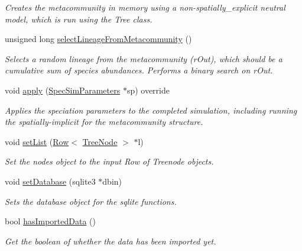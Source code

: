 \begin{DoxyCompactItemize}
\begin{DoxyCompactList}\small\item\em Creates the metacommunity in memory using a non-\/spatially\+\_\+explicit neutral model, which is run using the Tree class. \end{DoxyCompactList}\item 
unsigned long \hyperlink{group___community_objects_ac1884bfd79b272d8dcb470f34f579cf1}{select\+Lineage\+From\+Metacommunity} ()
\begin{DoxyCompactList}\small\item\em Selects a random lineage from the metacommunity (r\+Out), which should be a cumulative sum of species abundances. Performs a binary search on r\+Out. \end{DoxyCompactList}\item 
void \hyperlink{group___community_objects_adf30667aa617bc969706eab2facd5482}{apply} (\hyperlink{struct_spec_sim_parameters}{Spec\+Sim\+Parameters} $\ast$sp) override
\begin{DoxyCompactList}\small\item\em Applies the speciation parameters to the completed simulation, including running the spatially-\/implicit for the metacommunity structure. \end{DoxyCompactList}\item 
void \hyperlink{group___community_objects_a710a402dffa1b85183dd7f4a5a44f988}{set\+List} (\hyperlink{class_row}{Row}$<$ \hyperlink{class_tree_node}{Tree\+Node} $>$ $\ast$l)
\begin{DoxyCompactList}\small\item\em Set the nodes object to the input Row of Treenode objects. \end{DoxyCompactList}\item 
void \hyperlink{group___community_objects_a6fe2fdb93911f403dd879ca2847e4933}{set\+Database} (sqlite3 $\ast$dbin)
\begin{DoxyCompactList}\small\item\em Sets the database object for the sqlite functions. \end{DoxyCompactList}\item 
bool \hyperlink{group___community_objects_a045f762ca30c3a20e8ef5911a4982160}{has\+Imported\+Data} ()
\begin{DoxyCompactList}\small\item\em Get the boolean of whether the data has been imported yet. \end{DoxyCompactList}\item 

\end{DoxyCompactItemize}
